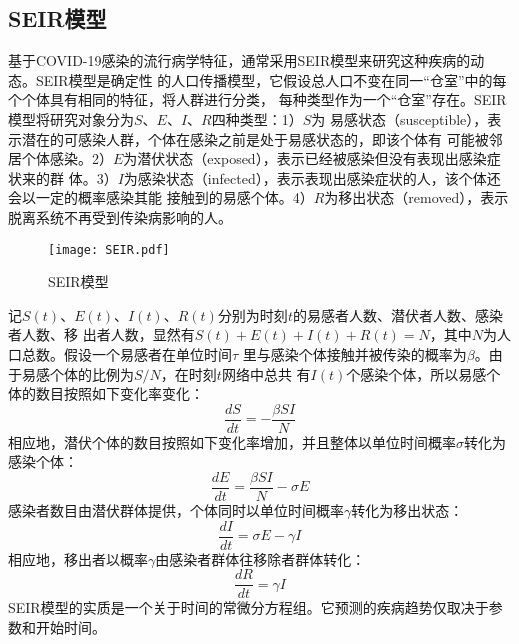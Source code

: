 \documentclass[lang=cn,12pt,a4paper,cite=authoryear]{elegantpaper}
\begin{document}
\subsection{SEIR模型}

基于COVID-19感染的流行病学特征，通常采用SEIR模型来研究这种疾病的动态。SEIR模型是确定性
的人口传播模型，它假设总人口不变在同一“仓室”中的每个个体具有相同的特征，将人群进行分类，
每种类型作为一个“仓室”存在。SEIR模型将研究对象分为$S$、$E$、$I$、$R$四种类型：1）$S$为
易感状态（susceptible），表示潜在的可感染人群，个体在感染之前是处于易感状态的，即该个体有
可能被邻居个体感染。2）$E$为潜伏状态（exposed），表示已经被感染但没有表现出感染症状来的群
体。3）$I$为感染状态（infected），表示表现出感染症状的人，该个体还会以一定的概率感染其能
接触到的易感个体。4）$R$为移出状态（removed），表示脱离系统不再受到传染病影响的人。

\begin{figure}
	\centering
	\texttt{[image: SEIR.pdf]}
	\caption{SEIR模型}
	\label{fig:SEIR}
\end{figure}

记$S(t)$、$E(t)$、$I(t)$、$R(t)$分别为时刻$t$的易感者人数、潜伏者人数、感染者人数、移
出者人数，显然有$S(t)+E(t)+I(t)+R(t)=N$，其中$N$为人口总数。假设一个易感者在单位时间$\tau$
里与感染个体接触并被传染的概率为$\beta$。由于易感个体的比例为$S/N$，在时刻$t$网络中总共
有$I(t)$个感染个体，所以易感个体的数目按照如下变化率变化：
\begin{equation}
\frac{dS}{dt}=-\frac{\beta SI}{N}
\end{equation}
相应地，潜伏个体的数目按照如下变化率增加，并且整体以单位时间概率$\sigma$转化为感染个体：
\begin{equation}
\frac{dE}{dt}=\frac{\beta SI}{N}-\sigma E
\end{equation}
感染者数目由潜伏群体提供，个体同时以单位时间概率$\gamma$转化为移出状态：
\begin{equation}
\frac{dI}{dt}=\sigma E-\gamma I
\end{equation}
相应地，移出者以概率$\gamma$由感染者群体往移除者群体转化：
\begin{equation}
\frac{dR}{dt}=\gamma I
\end{equation}
SEIR模型的实质是一个关于时间的常微分方程组。它预测的疾病趋势仅取决于参数和开始时间。
\end{document}
